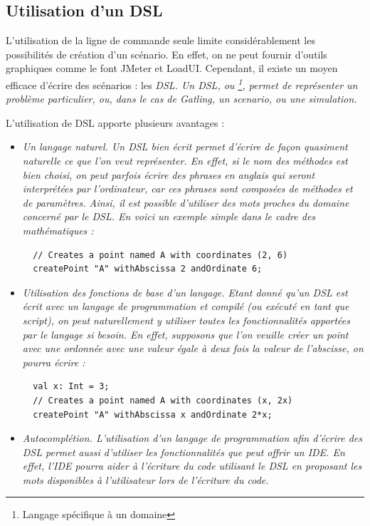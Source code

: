 \subsection{Utilisation d'un DSL}
L'utilisation de la ligne de commande seule limite considérablement les possibilités de création d'un scénario. En effet, on ne peut fournir d'outils graphiques comme le font JMeter et LoadUI. Cependant, il existe un moyen efficace d'écrire des scénarios : les \em{DSL}. Un DSL, ou \footnote{Langage spécifique à un domaine}, permet de représenter un problème particulier, ou, dans le cas de Gatling, un scenario, ou une simulation.

L'utilisation de DSL apporte plusieurs avantages :
\begin{itemize}
  \item \em{Un langage naturel}. Un DSL bien écrit permet d'écrire de façon quasiment naturelle ce que l'on veut représenter. En effet, si le nom des méthodes est bien choisi, on peut parfois écrire des phrases en anglais qui seront interprétées par l'ordinateur, car ces phrases sont composées de méthodes et de paramètres. Ainsi, il est possible d'utiliser des mots proches du domaine concerné par le DSL. En voici un exemple simple dans le cadre des mathématiques :
  \begin{lstlisting}
  // Creates a point named A with coordinates (2, 6)
  createPoint "A" withAbscissa 2 andOrdinate 6;
  \end{lstlisting}
  \item \em{Utilisation des fonctions de base d'un langage}. Etant donné qu'un DSL est écrit avec un langage de programmation et compilé (ou exécuté en tant que script), on peut naturellement y utiliser toutes les fonctionnalités apportées par le langage si besoin. En effet, supposons que l'on veuille créer un point avec une ordonnée avec une valeur égale à deux fois la valeur de l'abscisse, on pourra écrire :
  \begin{lstlisting}
  val x: Int = 3;
  // Creates a point named A with coordinates (x, 2x)
  createPoint "A" withAbscissa x andOrdinate 2*x;
  \end{lstlisting}
  \item \em{Autocomplétion}. L'utilisation d'un langage de programmation afin d'écrire des DSL permet aussi d'utiliser les fonctionnalités que peut offrir un IDE. En effet, l'IDE pourra aider à l'écriture du code utilisant le DSL en proposant les mots disponibles à l'utilisateur lors de l'écriture du code.
\end{itemize}

